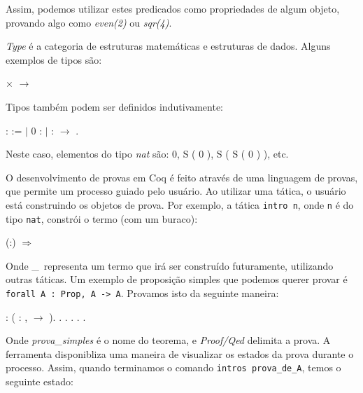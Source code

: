 Assim, podemos utilizar estes predicados como propriedades de algum objeto,
provando algo como \emph{even(2)} ou \emph{sqr(4)}.

\emph{Type} é a categoria de estruturas matemáticas e estruturas de dados.
Alguns exemplos de tipos são:

\bigskip
{} \ensuremath{\times}  \ensuremath{\rightarrow} 
\bigskip

Tipos também podem ser definidos indutivamente:

\bigskip
{}  :  :=\coqdoceol
\coqdocindent{2.00em} \ensuremath{|} 0 : \coqdoceol 
\coqdocindent{2.00em} \ensuremath{|}  :  \ensuremath{\rightarrow}
.\coqdoceol
\bigskip

Neste caso, elementos do tipo \emph{nat} são: 0, S ( 0 ), S ( S ( 0 ) ), etc.

O desenvolvimento de provas em Coq é feito através de uma linguagem de provas,
que permite um processo guiado pelo usuário. Ao utilizar uma tática, o usuário
está construindo os objetos de prova. Por exemplo, a tática
\texttt{intro n}, onde \texttt{n} é do tipo \texttt{nat}, constrói o termo (com um
buraco):

\bigskip
{} (:) \ensuremath{\Rightarrow} \coqdocvar{\_}\coqdoceol
\bigskip

Onde \_\ representa um termo que irá ser construído futuramente, utilizando
outras táticas. Um exemplo de proposição simples que podemos querer provar é
\texttt{forall A : Prop, A -> A}. Provamos isto da seguinte maneira:

\bigskip
\coqdocnoindent
{}  : (\coqdockw{\ensuremath{\forall}}  : ,  \ensuremath{\rightarrow} ).\coqdoceol
\coqdocnoindent
{}.\coqdoceol
\coqdocindent{1.00em}
 .\coqdoceol
\coqdocindent{1.00em}
 .\coqdoceol
\coqdocindent{1.00em}
 .\coqdoceol
\coqdocnoindent
{}.\coqdoceol
\bigskip

Onde \emph{prova\_simples} é o nome do teorema, e \emph{Proof/Qed} delimita a
prova. A ferramenta disponibliza uma maneira de visualizar os estados da prova
durante o processo. Assim, quando terminamos o comando \texttt{intros
prova\_de\_A}, temos o seguinte estado:

